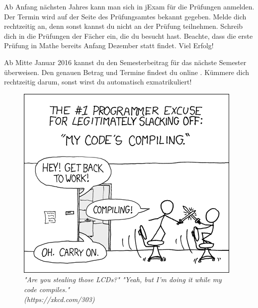 \begin{itemize}[leftmargin=*]
\newpage


Ab Anfang nächsten Jahres kann man sich in jExam für die Prüfungen anmelden. Der Termin wird auf der Seite des Prüfungsamtes bekannt gegeben. Melde dich rechtzeitig an, denn sonst kannst du nicht an der Prüfung teilnehmen.
Schreib dich in die Prüfungen der Fächer ein, die du besucht hast.
Beachte, dass die erste Prüfung in Mathe bereits Anfang Dezember statt findet.
Viel Erfolg!

Ab Mitte Januar 2016 kannst du den Semesterbeitrag für das nächste Semester überweisen.
Den genauen Betrag und Termine findest du online .
Kümmere dich rechtzeitig darum, sonst wirst du automatisch exmatrikuliert!

\end{itemize}

\vfill

\begin{figure}[h!]
\centering
\includegraphics[scale=.4]{img/xkcd/compiling.png}
\caption*{{\small \textit{"Are you stealing those LCDs?" "Yeah, but I'm doing it while my code compiles."\\\hspace*{1mm}\hfill(https://xkcd.com/303)}}}
\end{figure}

